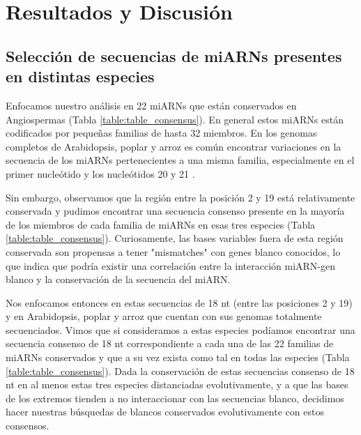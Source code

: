 \section{Resultados y Discusión}

\subsection{Selección de secuencias de miARNs presentes en distintas especies}

Enfocamos nuestro análisis en 22 miARNs que están conservados en Angiospermas \citep{citeulike:8816489,10.1371/journal.pgen.1002419} (Tabla \ref{table:table_consensus}).
En general estos miARNs están codificados por pequeñas familias de hasta 32 miembros.
En los genomas completos de Arabidopsis, poplar y arroz es común encontrar variaciones en la secuencia de los miARNs pertenecientes a una misma familia, especialmente en el primer nucleótido y los nucleótidos 20 y 21 \citep{10.1371/journal.pgen.1002419}.

Sin embargo, observamos que la región entre la posición 2 y 19 está relativamente conservada y pudimos encontrar una secuencia consenso presente en la mayoría de los miembros de cada familia de miARNs en esas tres especies (Tabla \ref{table:table_consensus}).
Curiosamente, las bases variables fuera de esta región conservada son propensas a tener "mismatches" con genes blanco conocidos, lo que indica que podría existir una correlación entre la interacción miARN-gen blanco y la conservación de la secuencia del miARN.

Nos enfocamos entonces en estas secuencias de 18 nt (entre las posiciones 2 y 19) y en Arabidopsis, poplar y arroz que cuentan con sus genomas totalmente secuenciados.
Vimos que si consideramos a estas especies podíamos encontrar una secuencia consenso de 18 nt correspondiente a cada una de las 22 familias de miARNs conservados y que a su vez exista como tal en todas las especies (Tabla \ref{table:table_consensus}).
Dada la conservación de estas secuencias consenso de 18 nt en al menos estas tres especies distanciadas evolutivamente, y a que las bases de los extremos tienden a no interaccionar con las secuencias blanco, decidimos hacer nuestras búsquedas de blancos conservados evolutivamente con estos consensos.



